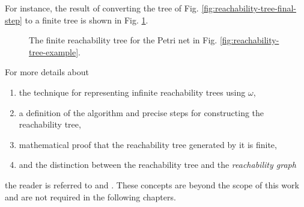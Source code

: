 For instance, the result of converting the tree of Fig. \ref{fig:reachability-tree-final-step}
to a finite tree is shown in Fig. \ref{fig:reachability-tree-final-step-finite}.

\begin{figure}[!htb]
      \centering
      
      \caption{The finite reachability tree for the Petri net in Fig.
            \ref{fig:reachability-tree-example}.}
      \label{fig:reachability-tree-final-step-finite}
\end{figure}

For more details about

\begin{enumerate}
      \item the technique for representing infinite reachability trees using $\omega$,
      \item a definition of the algorithm and precise steps for constructing the reachability tree,
      \item mathematical proof that the reachability tree generated by it is finite,
      \item and the distinction between the reachability tree and the \emph{reachability graph}
\end{enumerate}

the reader is referred to \cite{murata1989} and \cite{peterson1981}.
These concepts are beyond the scope of this work
and are not required in the following chapters.